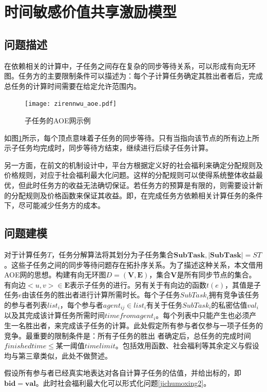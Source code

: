 \documentclass[promaster]{thesis-uestc}
\begin{document}
\section{时间敏感价值共享激励模型}

\subsection{问题描述}
在依赖相关的计算中，子任务之间存在复杂的同步等待关系，可以形成有向无环图。任务方的主要限制条件可以描述为：每个子计算任务确定其胜出者者后，完成总任务的计算时间需要在给定允许范围内。

\begin{figure}[h]
\texttt{[image: zirennwu\_aoe.pdf]}
\caption{子任务的AOE网示例}
\label{zirennwu_aoe}
\end{figure}

如图\ref{zirennwu_aoe}所示，每个顶点意味着子任务的同步等待。只有当指向该节点的所有边上所示子任务均完成时，同步等待方结束，继续进行后续子任务计算。

另一方面，在前文的机制设计中，平台方根据定义好的社会福利来确定分配规则及价格规则，对应于社会福利最大化问题。这样的分配规则可以使得系统整体收益最优，但此时任务方的收益无法确切保证。若任务方的预算是有限的，则需要设计新的分配规则及价格函数来保证其收益。即，在完成任务方依赖相关计算任务的条件下，尽可能减少任务方的成本。

\FloatBarrier

\subsection{问题建模}

对于计算任务$T$，任务分解算法将其划分为子任务集合$\mathbf{SubTask},|\mathbf{SubTask}| = ST$。这些子任务之间的同步等待问题存在拓扑序关系。为了描述这种关系，本文借用AOE网的思想。构建有向无环图$D=(\mathbf{V},\mathbf{E})$，集合$\mathbf{V}$是所有同步节点的集合。有向边$<u,v> \in \mathbf{E}$表示子任务的进行。另有关于有向边的函数$t(e)$，其值是子任务$e$由该任务的胜出者进行计算所需时长。每个子任务$SubTask_i$拥有竞争该任务的参与者列表$list_i$，每个参与者$agent_{ij} \in list_i$有关于任务$SubTask_i$的私密估值$val_i$以及其完成该计算任务所需时间$timefromagent_i$。每个列表中只能产生也必须产生一名胜出者，来完成该子任务的计算。此处假定所有参与者仅参与一项子任务的竞争。最重要的限制条件是：所有子任务的胜出
者确定后，总任务的完成时间$finishedtime \leq $某一阈值$timelimit$。包括效用函数、社会福利等其余定义与假设均与第三章类似，此处不做赘述。

假设所有参与者已经真实地表达对各自计算子任务的估值，并给出标的，即$\mathbf{bid}=\mathbf{val}$。此时社会福利最大化可以形式化问题\ref{jichumoxing2}。
\end{document}
